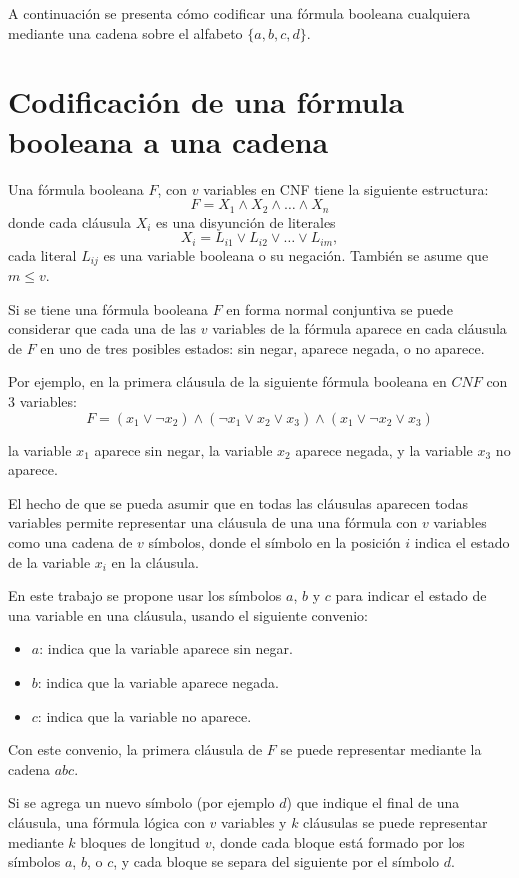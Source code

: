 A continuación se presenta cómo codificar una fórmula booleana cualquiera mediante una cadena sobre el alfabeto $\{a,b,c,d\}$.

\section{Codificación de una fórmula booleana a una cadena}
\label{sec:codsat}

Una fórmula booleana $F$, con $v$ variables en CNF tiene la siguiente estructura:
$$F=X_1 \wedge X_2 \wedge \ldots \wedge X_n$$
donde cada cláusula $X_i$ es una disyunción de literales
$$X_i=L_{i1} \vee L_{i2} \vee \ldots \vee L_{im},$$
cada literal $L_{ij}$ es una variable booleana o su negación. También se asume que $m\leq v$. 

Si se tiene una fórmula booleana $F$ en forma normal conjuntiva se puede considerar que cada una de 
las $v$ variables de la fórmula aparece en cada cláusula de $F$ en uno de tres posibles estados: 
sin negar, aparece negada, o  no aparece.

Por ejemplo, en la primera cláusula de la siguiente fórmula booleana en $CNF$ con 3 variables:
$$F=(x_1 \vee \neg x_2) \wedge (\neg x_1 \vee x_2 \vee x_3) \wedge (x_1 \vee \neg x_2 \vee x_3)$$

la variable $x_1$ aparece sin negar, la variable $x_2$ aparece negada, y la variable $x_{3}$ no aparece.

El hecho de que se pueda asumir que en todas las cláusulas aparecen todas variables permite representar una cláusula de una una fórmula con $v$ variables como una cadena de $v$ símbolos, donde el símbolo en la posición $i$ indica el estado de la variable $x_i$ en la cláusula.

En este trabajo se propone usar los símbolos $a$, $b$ y $c$ para indicar el estado de una variable en una cláusula, usando el siguiente convenio:

\begin{itemize}
    \item $a$: indica que la variable aparece sin negar.
    \item $b$: indica que la variable aparece negada.
    \item $c$: indica que la variable no aparece.
\end{itemize}

Con este convenio, la primera cláusula de $F$ se puede representar mediante la cadena $abc$.

Si se agrega un nuevo símbolo (por ejemplo $d$) que indique el final de una cláusula, una fórmula lógica con $v$ variables y $k$ cláusulas se puede representar mediante $k$ bloques de longitud $v$, donde cada bloque está formado por los símbolos $a$, $b$, o $c$, y cada bloque se separa del siguiente por el símbolo $d$.

